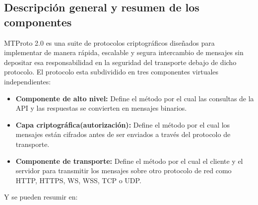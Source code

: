 \subsection{Descripción general y resumen de los componentes}
MTProto 2.0 es una suite de protocolos criptográficos diseñados para implementar de manera rápida, escalable y segura intercambio de mensajes sin depositar esa responsabilidad en la seguridad del transporte debajo de dicho protocolo.
El protocolo esta subdividido en tres componentes virtuales independientes:
\begin{itemize}
	\item \textbf{Componente de alto nivel:} Define el método por el cual las consultas de la API y las respuestas se convierten en mensajes binarios. 
	\item \textbf{Capa criptográfica(autorización):} Define el método por el cual los mensajes están cifrados antes de ser enviados a través del protocolo de transporte.
	\item \textbf{Componente de transporte:} Define el método por el cual el cliente y el servidor para transmitir los mensajes sobre otro protocolo de red como HTTP, HTTPS, WS, WSS, TCP o UDP.
\end{itemize}
Y se pueden resumir en:
